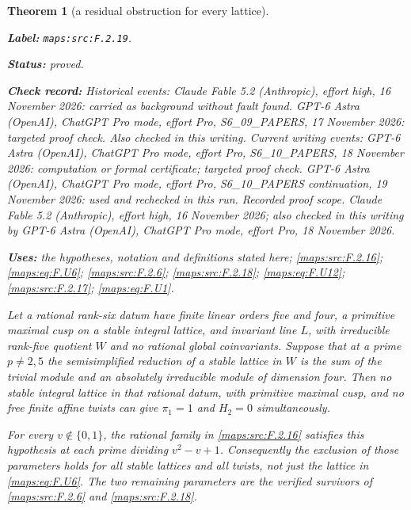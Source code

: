 \documentclass[11pt,a4paper]{article}
\newtheorem{theorem}{Theorem}[section]
\theoremstyle{definition}
\newcommand{\StatementRecord}[4]{\par\smallskip\begingroup\upshape\raggedright\noindent\textbf{Label:} \nolinkurl{#1}.\par\noindent\textbf{Status:} #2.\par\noindent\textbf{Check record:} #3.\par\noindent\textbf{Uses:} #4.\par\endgroup\smallskip}
\begin{document}
\begin{theorem}[a residual obstruction for every lattice]\label{maps:src:F.2.19}
\StatementRecord{maps:src:F.2.19}{proved}{Historical events: Claude Fable 5.2 (Anthropic), effort high, 16 November 2026: carried as background without fault found. GPT-6 Astra (OpenAI), ChatGPT Pro mode, effort Pro, S6\_09\_PAPERS, 17 November 2026: targeted proof check. Also checked in this writing. Current writing events: GPT-6 Astra (OpenAI), ChatGPT Pro mode, effort Pro, S6\_10\_PAPERS, 18 November 2026: computation or formal certificate; targeted proof check. GPT-6 Astra (OpenAI), ChatGPT Pro mode, effort Pro, S6\_10\_PAPERS continuation, 19 November 2026: used and rechecked in this run. \emph{Recorded proof scope.} Claude Fable 5.2 (Anthropic), effort high, 16 November 2026; also checked in this writing by GPT-6 Astra (OpenAI), ChatGPT Pro mode, effort Pro, 18 November 2026}{the hypotheses, notation and definitions stated here; \cref{maps:src:F.2.16}; \cref{maps:eq:F.U6}; \cref{maps:src:F.2.6}; \cref{maps:src:F.2.18}; \cref{maps:eq:F.U12}; \cref{maps:src:F.2.17}; \cref{maps:eq:F.U1}}


Let a rational rank-six datum have finite linear orders five
and four, a primitive maximal cusp on a stable integral lattice,
and invariant line $L$, with irreducible rank-five quotient $W$
and no rational global coinvariants.  Suppose that at a prime
$p\ne2,5$ the semisimplified reduction of a stable lattice in
$W$ is the sum of the trivial module and an absolutely
irreducible module of dimension four.  Then no stable integral
lattice in that rational datum, with primitive maximal cusp,
and no free finite affine twists can give
$\pi_1=1$ and $H_2=0$ simultaneously.

For every $v\notin\{0,1\}$, the rational family in \ref{maps:src:F.2.16}
satisfies this hypothesis at each prime dividing
$v^2-v+1$.  Consequently the exclusion of those parameters
holds for \emph{all} stable lattices and all twists, not just
the lattice in \eqref{maps:eq:F.U6}.  The two remaining parameters are the
verified survivors of \ref{maps:src:F.2.6} and \ref{maps:src:F.2.18}.

\end{theorem}
\end{document}
